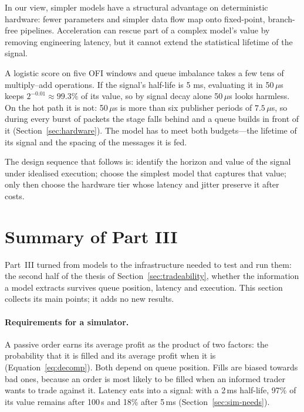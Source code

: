 In our view, simpler models have a structural advantage on deterministic hardware: fewer parameters and
simpler data flow map onto fixed-point, branch-free pipelines. Acceleration can rescue part of a
complex model's value by removing engineering latency, but it cannot extend the statistical
lifetime of the signal.

\begin{example}
A logistic score on five OFI windows and queue imbalance takes a few tens of multiply--add
operations. If the signal's half-life is 5 ms, evaluating it in 50\,$\mu$s keeps $2^{-0.01} \approx 99.3\%$ of its
value, so by signal decay alone 50\,$\mu$s looks harmless. On the hot path it is not: 50\,$\mu$s is more than six
publisher periods of $7.5\,\mu$s, so during every burst of packets the stage falls behind and a queue builds in front
of it (Section~\ref{sec:hardware}). The model has to meet both budgets---the lifetime of its signal and the
spacing of the messages it is fed.
\end{example}

The design sequence that follows is: identify the horizon and value of the signal under idealised
execution; choose the simplest model that captures that value; only then choose the hardware tier
whose latency and jitter preserve it after costs.

\section{Summary of Part III}
\label{sec:part3-summary}

Part~III turned from models to the infrastructure needed to test and run them: the second half of the thesis of
Section~\ref{sec:tradeability}, whether the information a model extracts survives queue position, latency and
execution. This section collects its main points; it adds no new results.

\paragraph{Requirements for a simulator.} A passive order earns its average profit as the product of two factors:
the probability that it is filled and its average profit when it is (Equation~\eqref{eq:decomp}). Both depend on
queue position. Fills are biased towards bad ones, because an order is most likely to be filled when an informed
trader wants to trade against it. Latency eats into a signal: with a 2\,ms half-life, 97\% of its value remains after
100\,\textmu s and 18\% after 5\,ms (Section~\ref{sec:sim-needs}).

